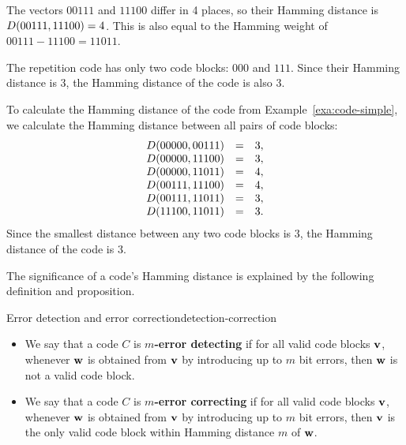 \begin{solution}
  The vectors $00111$ and $11100$ differ in 4 places, so their Hamming
  distance is $D(00111,11100)=4$. This is also equal to the Hamming
  weight of $00111-11100 = 11011$.

  The repetition code has only two code blocks: $000$ and
  $111$. Since their Hamming distance is 3, the Hamming distance of
  the code is also 3.

  To calculate the Hamming distance of the code from
  Example~\ref{exa:code-simple}, we calculate the Hamming distance
  between all pairs of code blocks:
  \begin{equation*}
    \begin{array}{rcl}
      D(00000,00111) &=& 3, \\
      D(00000,11100) &=& 3, \\
      D(00000,11011) &=& 4, \\
      D(00111,11100) &=& 4, \\
      D(00111,11011) &=& 3, \\
      D(11100,11011) &=& 3. \\
    \end{array}
  \end{equation*}
  Since the smallest distance between any two code blocks is $3$, the
  Hamming distance of the code is $3$.
\end{solution}

The significance of a code's Hamming distance is explained by the
following definition and proposition.

\begin{definition}{Error detection and error correction}{detection-correction}
  \begin{itemize}
  \item We say that a code $C$ is \textbf{$m$-error detecting}%
     if for all
    valid code blocks $\mbox{\bf v}$, whenever\/ $\mbox{\bf w}$ is obtained
    from $\mbox{\bf v}$ by introducing up to $m$ bit errors, then
    $\mbox{\bf w}$ is not a valid code block.
  \item We say that a code $C$ is \textbf{$m$-error correcting}%
     if for
    all valid code blocks $\mbox{\bf v}$, whenever\/ $\mbox{\bf w}$ is
    obtained from $\mbox{\bf v}$ by introducing up to $m$ bit errors, then
    $\mbox{\bf v}$ is the only valid code block within Hamming distance
    $m$ of $\mbox{\bf w}$.
  \end{itemize}  
\end{definition}

